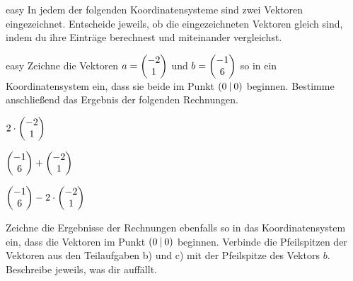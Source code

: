 \documentclass[]{uebungsblatt}
\begin{document}
    \begin{exercise}{easy}
        In jedem der folgenden Koordinatensysteme sind zwei Vektoren eingezeichnet. Entscheide jeweils, 
        ob die eingezeichneten Vektoren gleich sind, indem du ihre Einträge berechnest und miteinander vergleichst.

        \begin{multicols}{3}
            \centering



        \end{multicols}
    \end{exercise}

    \begin{exercise}{easy}
        Zeichne die Vektoren $a=\begin{pmatrix} -2\\ 1 \end{pmatrix}$ und $b=\begin{pmatrix} -1\\ 6 \end{pmatrix}$ so in ein Koordinatensystem ein, dass sie beide 
        im Punkt $\left(0 \:\middle|\: 0\right)$ beginnen. Bestimme anschließend das Ergebnis der folgenden Rechnungen.
        \begin{enumerate}
            \begin{multicols}{3}
                \item $2\cdot \begin{pmatrix} -2\\ 1 \end{pmatrix}$
                \item $\begin{pmatrix} -1\\ 6 \end{pmatrix}+\begin{pmatrix} -2\\ 1 \end{pmatrix}$
                \item $\begin{pmatrix} -1\\ 6 \end{pmatrix}-2\cdot\begin{pmatrix} -2\\ 1 \end{pmatrix}$
            \end{multicols}
        \end{enumerate}
        Zeichne die Ergebnisse der Rechnungen ebenfalls so in das Koordinatensystem ein, dass die Vektoren im Punkt 
        $\left(0 \:\middle|\: 0\right)$ beginnen. Verbinde die Pfeilspitzen der Vektoren aus den Teilaufgaben b) und c) mit der 
        Pfeilspitze des Vektors $b$. Beschreibe jeweils, was dir auffällt.
    \end{exercise}
\end{document}
